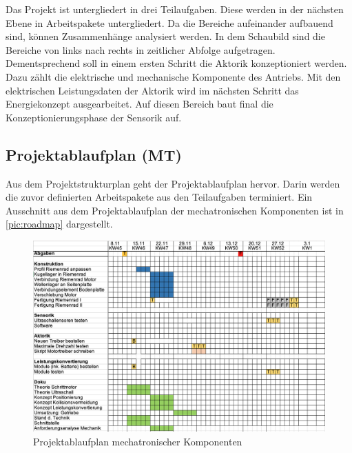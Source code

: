 Das Projekt ist untergliedert in drei Teilaufgaben. Diese werden in der nächsten Ebene in Arbeitspakete untergliedert. 
Da die Bereiche aufeinander aufbauend sind, können Zusammenhänge analysiert werden. In dem Schaubild sind die Bereiche von links nach rechts in zeitlicher Abfolge aufgetragen. Dementsprechend soll in einem ersten Schritt die Aktorik konzeptioniert werden. Dazu zählt die elektrische und mechanische Komponente des Antriebs. Mit den elektrischen Leistungsdaten der Aktorik wird im nächsten Schritt das Energiekonzept ausgearbeitet. Auf diesen Bereich baut final die Konzeptionierungsphase der Sensorik auf. \\ 

\newpage
\subsection{Projektablaufplan (MT)}
\label{sec:projektablaufplan}
Aus dem Projektstrukturplan geht der Projektablaufplan hervor. Darin werden die zuvor definierten Arbeitspakete aus den Teilaufgaben terminiert. Ein Ausschnitt aus dem Projektablaufplan der mechatronischen Komponenten ist in \autoref{pic:roadmap} dargestellt. 
\begin{figure}[h]
	\begin{center}
		\includegraphics[width=17cm]{roadmap.png}
		\caption{Projektablaufplan mechatronischer Komponenten}
		\label{pic:roadmap}
	\end{center}
\end{figure}

